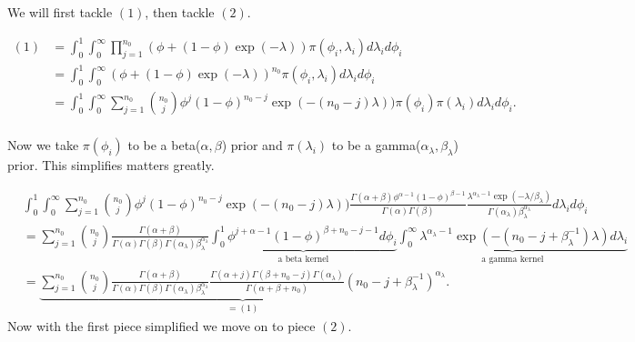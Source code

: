 We will first tackle $(1)$, then tackle $(2)$. 

\begin{align*}
(1)&= \int_0^1\int_0^\infty\prod_{j=1}^{n_0}(\phi + (1-\phi)\exp{(-\lambda)})\pi(\phi_i,\lambda_i )d\lambda_id\phi_i \\
&= \int_0^1\int_0^\infty(\phi + (1-\phi)\exp{(-\lambda)})^{n_0}\pi(\phi_i,\lambda_i )d\lambda_id\phi_i \\
&= \int_0^1\int_0^\infty\sum_{j=1}^{n_0}{n_0\choose j}\phi^{j}(1-\phi)^{n_0-j}\exp{(-(n_0-j)\lambda)})\pi(\phi_i)\pi(\lambda_i )d\lambda_id\phi_i. \\
\end{align*}
 
 Now we take $\pi(\phi_i)$ to be a beta($\alpha, \beta$) prior and $\pi(\lambda_i)$ to be a gamma($\alpha_{\lambda}, \beta_{\lambda}$) prior. This simplifies matters greatly. 
 
 \begin{align*}
 & \int_0^1\int_0^\infty\sum_{j=1}^{n_0}{n_0\choose j}\phi^{j}(1-\phi)^{n_0-j}\exp{(-(n_0-j)\lambda)})\frac{\Gamma(\alpha+\beta)\phi^{\alpha-1}(1-\phi)^{\beta-1}}{\Gamma(\alpha)\Gamma(\beta)}\frac{\lambda^{\alpha_{\lambda}-1}\exp{(-\lambda/\beta_{\lambda})}}{\Gamma(\alpha_{\lambda})\beta_{\lambda}^{\alpha_{\lambda}}} d\lambda_id\phi_i \\
&=\sum_{j=1}^{n_0}{n_0\choose j}\frac{\Gamma(\alpha+\beta)}{\Gamma(\alpha)\Gamma(\beta)\Gamma(\alpha_{\lambda})\beta_{\lambda}^{\alpha_{\lambda}}} \underbrace{\int_0^1\phi^{j+\alpha-1}(1-\phi)^{\beta+n_0-j-1}d\phi_i}_{\text{a beta kernel}}  \underbrace{\int_0^\infty \lambda^{\alpha_{\lambda}-1} \exp{(-(n_0-j+\beta_{\lambda}^{-1})\lambda)} d\lambda_i}_{\text{a gamma kernel}}\\
&=\underbrace{\sum_{j=1}^{n_0}{n_0\choose j}\frac{\Gamma(\alpha+\beta)}{\Gamma(\alpha)\Gamma(\beta)\Gamma(\alpha_{\lambda})\beta_{\lambda}^{\alpha_{\lambda}}} \frac{\Gamma(\alpha+j)\Gamma(\beta+n_0-j)\Gamma(\alpha_{\lambda})}{\Gamma(\alpha+\beta+n_0)}(n_0-j+\beta_{\lambda}^{-1})^{\alpha_{\lambda}}}_{=(1)}.
\end{align*} 
Now with the first piece simplified we move on to piece $(2)$. 
 
